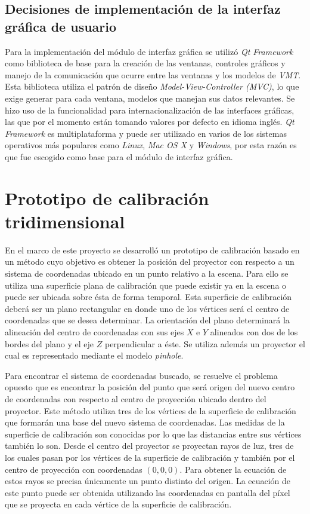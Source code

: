 \subsection{Decisiones de implementación de la interfaz gráfica de usuario}
Para la implementación del módulo de interfaz gráfica se utilizó \emph{Qt Framework}\cite{Qt-framework} como biblioteca de base para la creación de las ventanas, controles gráficos y manejo de la comunicación que ocurre entre las ventanas y los modelos de \emph{VMT}. Esta biblioteca utiliza el patrón de diseño \emph{Model-View-Controller (MVC)}\cite{QTMVC}, lo que exige generar para cada ventana, modelos que manejan sus datos relevantes.
Se hizo uso de la funcionalidad para internacionalización de las interfaces gráficas, las que por el momento están tomando valores por defecto en idioma inglés. \emph{Qt Framework} es multiplataforma y puede ser utilizado en varios de los sistemas operativos más populares como \emph{Linux}, \emph{Mac OS X} y \emph{Windows}, por esta razón es que fue escogido como base para el módulo de interfaz gráfica.

\section{Prototipo de calibración tridimensional}
En el marco de este proyecto se desarrolló un prototipo de calibración basado en un método cuyo objetivo es obtener la posición del proyector con respecto a un sistema de coordenadas ubicado en un punto relativo a la escena. Para ello se utiliza una superficie plana de calibración que puede existir ya en la escena o puede ser ubicada sobre ésta de forma temporal. Esta superficie de calibración deberá ser un plano rectangular en donde uno de los vértices será el centro de coordenadas que se desea determinar. La orientación del plano determinará la alineación del centro de coordenadas con sus ejes $X$ e $Y$ alineados con dos de los bordes del plano y el eje $Z$ perpendicular a éste.
Se utiliza además un proyector el cual es representado mediante el modelo \emph{pinhole}.

Para encontrar el sistema de coordenadas buscado, se resuelve el problema opuesto que es encontrar la posición del punto que será origen del nuevo centro de coordenadas con respecto al centro de proyección ubicado dentro del proyector. Este método utiliza tres de los vértices de la superficie de calibración que formarán una base del nuevo sistema de coordenadas. Las medidas de la superficie de calibración son conocidas por lo que las distancias entre sus vértices también lo son. Desde el centro del proyector se proyectan rayos de luz, tres de los cuales pasan por los vértices de la superficie de calibración y también por el centro de proyección con coordenadas $(0, 0, 0)$. Para obtener la ecuación de estos rayos se precisa únicamente un punto distinto del origen. La ecuación de este punto puede ser obtenida utilizando las coordenadas en pantalla del píxel que se proyecta en cada vértice de la superficie de calibración.

